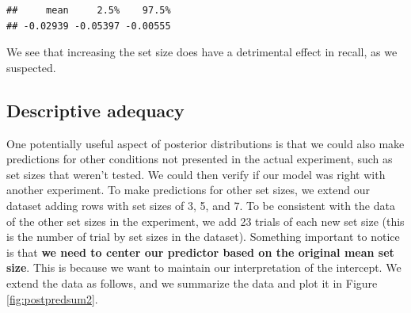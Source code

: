 \documentclass[12pt,]{krantz}
\newenvironment{Shaded}{\begin{snugshade}}{\end{snugshade}}
\newcommand{\ControlFlowTok}[1]{\textcolor[rgb]{0.13,0.29,0.53}{\textbf{#1}}}
\newcommand{\DataTypeTok}[1]{\textcolor[rgb]{0.13,0.29,0.53}{#1}}
\newcommand{\DecValTok}[1]{\textcolor[rgb]{0.00,0.00,0.81}{#1}}
\newcommand{\KeywordTok}[1]{\textcolor[rgb]{0.13,0.29,0.53}{\textbf{#1}}}
\newcommand{\NormalTok}[1]{#1}
\newcommand{\OperatorTok}[1]{\textcolor[rgb]{0.81,0.36,0.00}{\textbf{#1}}}
\newcommand{\StringTok}[1]{\textcolor[rgb]{0.31,0.60,0.02}{#1}}
\theoremstyle{definition}
\theoremstyle{definition}
\theoremstyle{definition}
\theoremstyle{remark}
\begin{document}
\begin{verbatim}
##     mean     2.5%    97.5% 
## -0.02939 -0.05397 -0.00555
\end{verbatim}

We see that increasing the set size does have a detrimental effect in recall, as we suspected.

\hypertarget{descriptive-adequacy}{%
\subsection{Descriptive adequacy}\label{descriptive-adequacy}}

One potentially useful aspect of posterior distributions is that we could also make predictions for other conditions not presented in the actual experiment, such as set sizes that weren't tested. We could then verify if our model was right with another experiment. To make predictions for other set sizes, we extend our dataset adding rows with set sizes of 3, 5, and 7. To be consistent with the data of the other set sizes in the experiment, we add 23 trials of each new set size (this is the number of trial by set sizes in the dataset). Something important to notice is that \textbf{we need to center our predictor based on the original mean set size}. This is because we want to maintain our interpretation of the intercept. We extend the data as follows, and we summarize the data and plot it in Figure \ref{fig:postpredsum2}.

\begin{Shaded}
\end{Shaded}
\end{document}

